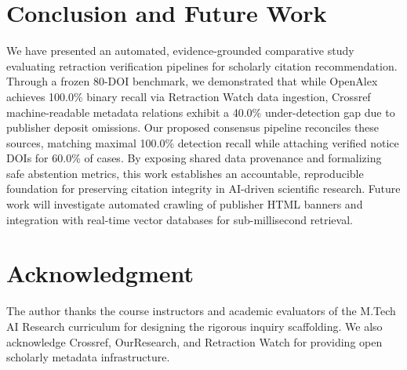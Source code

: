 \documentclass[10pt,a4paper,twocolumn]{article}
\begin{document}
\section{Conclusion and Future Work}
We have presented an automated, evidence-grounded comparative study evaluating retraction verification pipelines for scholarly citation recommendation. Through a frozen 80-DOI benchmark, we demonstrated that while OpenAlex achieves 100.0\% binary recall via Retraction Watch data ingestion, Crossref machine-readable metadata relations exhibit a 40.0\% under-detection gap due to publisher deposit omissions. Our proposed consensus pipeline reconciles these sources, matching maximal 100.0\% detection recall while attaching verified notice DOIs for 60.0\% of cases. By exposing shared data provenance and formalizing safe abstention metrics, this work establishes an accountable, reproducible foundation for preserving citation integrity in AI-driven scientific research. Future work will investigate automated crawling of publisher HTML banners and integration with real-time vector databases for sub-millisecond retrieval.

\section*{Acknowledgment}
The author thanks the course instructors and academic evaluators of the M.Tech AI Research curriculum for designing the rigorous inquiry scaffolding. We also acknowledge Crossref, OurResearch, and Retraction Watch for providing open scholarly metadata infrastructure.

\balance


\end{document}
